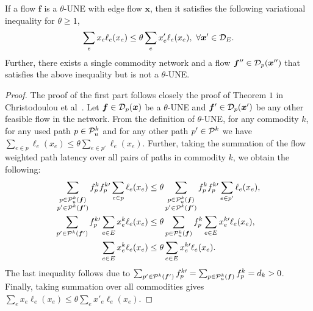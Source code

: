 \begin{lemma}\label{lemm:UNEvVI}
If a flow $\bm{f}$ is a $\theta$-UNE with edge flow $\bm{x}$, then it satisfies the following variational inequality for $\theta\geq 1$,
\begin{align}\label{eq:thetaVI}
\sum_e x_e\ell_e(x_e) \leq \theta\sum_e x'_e\ell_e(x_e), ~\forall \bm{x}'\in \mathcal{D}_E. 
\end{align}                                                                                                                           
Further, there exists a single commodity network and a flow $ \bm{f}'' \in \mathcal{D}_p(\bm{x}'')$ that satisfies the above inequality but is not a $\theta$-UNE.
\end{lemma}
\begin{proof}
The proof of the first part follows closely the proof of Theorem $1$ in Christodoulou et al~\cite{christodoulou2011performance}. Let $\bm{f} \in \mathcal{D}_p(\bm{x})$ be a $\theta$-UNE and  $\bm{f}' \in \mathcal{D}_p(\bm{x}')$ be any other feasible flow in the network. From the definition of $\theta$-UNE, for any commodity $k$, for any used path $p\in \mathcal{P}^k_u$ and for any other path $p'\in \mathcal{P}^k$ we have $\sum_{e\in p}\ell_e(x_e) \leq \theta \sum_{e\in p'}\ell_e(x_e).$  Further,  taking the summation of the flow weighted path latency over all pairs of paths in commodity $k$, we obtain the following:
\begin{align*}
\sum_{\substack{p\in \mathcal{P}^k_u(\bm{f})\\ p'\in \mathcal{P}^k(\bm{f}')}} f_p^k f_p^{k\prime}\sum_{e\in p}\ell_e(x_e) 
&\leq \theta\sum_{\substack{p\in \mathcal{P}^k_u(\bm{f})\\ p'\in \mathcal{P}^k(\bm{f}')}} f_p^k f_p^{k\prime}  \sum_{e\in p'}\ell_e(x_e), \\
\sum_{p'\in \mathcal{P}^k(\bm{f}')} f_p^{k\prime} \sum_{e\in E}x_e^k\ell_e(x_e) 
&\leq \theta \sum_{p\in \mathcal{P}^k_u(\bm{f})} f_p^k  \sum_{e\in E}x_e^{k\prime}\ell_e(x_e), \\
\sum_{e\in E}x_e^k\ell_e(x_e)&\leq \theta \sum_{e\in E}x_e^{k\prime}\ell_e(x_e).
\end{align*} 
The last inequality follows due to $\sum_{p'\in \mathcal{P}^k(\bm{f}')} f_p^{k\prime} = \sum_{p\in \mathcal{P}^k_u(\bm{f})} f_p^k = d_k>0$. Finally, taking summation over all commodities gives $\sum_e x_e\ell_e(x_e) \leq \theta\sum_e x'_e\ell_e(x_e)$.


\end{proof}
